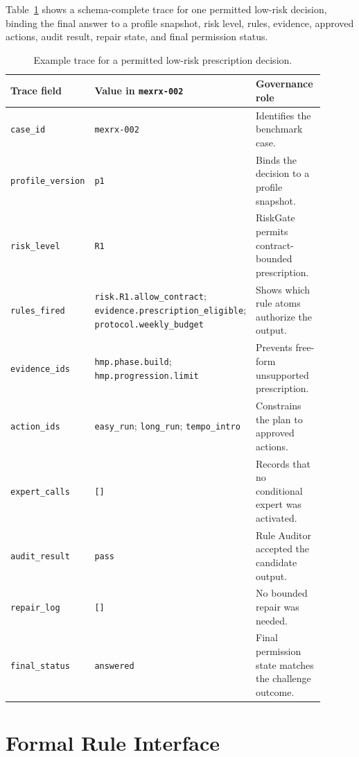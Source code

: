 \documentclass{ceurart}
\begin{document}
Table~\ref{tab:concrete-trace} shows a schema-complete trace for one permitted low-risk decision, binding the final answer to a profile snapshot, risk level, rules, evidence, approved actions, audit result, repair state, and final permission status.

\begin{table}[tbp]
\centering
\caption{Example trace for a permitted low-risk prescription decision.}
\label{tab:concrete-trace}
\small
\begin{tabular}{p{0.23\linewidth}p{0.36\linewidth}p{0.31\linewidth}}
\toprule
Trace field & Value in \texttt{mexrx-002} & Governance role \\
\midrule
\texttt{case\_id} & \texttt{mexrx-002} & Identifies the benchmark case. \\
\texttt{profile\_version} & \texttt{p1} & Binds the decision to a profile snapshot. \\
\texttt{risk\_level} & \texttt{R1} & RiskGate permits contract-bounded prescription. \\
\texttt{rules\_fired} & \texttt{risk.R1.allow\_contract}; \texttt{evidence.prescription\_eligible}; \texttt{protocol.weekly\_budget} & Shows which rule atoms authorize the output. \\
\texttt{evidence\_ids} & \texttt{hmp.phase.build}; \texttt{hmp.progression.limit} & Prevents free-form unsupported prescription. \\
\texttt{action\_ids} & \texttt{easy\_run}; \texttt{long\_run}; \texttt{tempo\_intro} & Constrains the plan to approved actions. \\
\texttt{expert\_calls} & \texttt{[]} & Records that no conditional expert was activated. \\
\texttt{audit\_result} & \texttt{pass} & Rule Auditor accepted the candidate output. \\
\texttt{repair\_log} & \texttt{[]} & No bounded repair was needed. \\
\texttt{final\_status} & \texttt{answered} & Final permission state matches the challenge outcome. \\
\bottomrule
\end{tabular}
\end{table}

\section{Formal Rule Interface}


\end{document}
